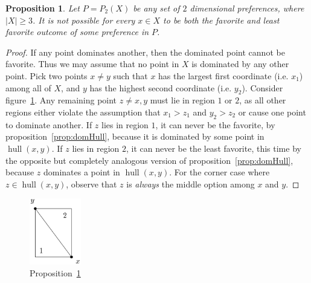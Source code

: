 \documentclass[12pt]{article}
\newtheorem{proposition}[theorem]{Proposition}
\DeclareMathOperator*{\hull}{hull}
\newcommand{\1}[1]{\mathds{1}[{#1}]}
\begin{document}
    \begin{proposition}\label{prop:noAllBestWorst}
      Let $P = P_2(X)$ be any set of $2$ dimensional preferences,
      where $|X| \ge 3$.
      It is not possible for every $x\in X$ to be both the
      favorite and least favorite outcome of some preference in $P$.
    \end{proposition}
    \begin{proof}
      If any point dominates another, then the dominated point cannot be favorite.
      Thus we may assume that no point in $X$ is dominated
      by any other point. Pick two points $x \ne y$ such that $x$ has the largest
      first coordinate (i.e. $x_1$) among all of $X$, and $y$ has the highest second
      coordinate (i.e. $y_2$).
      Consider figure~\ref{fig:noAllBestWorst}.
      Any remaining point $z\ne x,y$ must lie in region $1$ or $2$, as all other
      regions either violate the assumption that $x_1 > z_1$ and $y_2 > z_2$
      or cause one point to dominate another.
      If $z$ lies in region $1$, it can never be the favorite, by
      proposition~\ref{prop:domHull}, because it is dominated by some point in
      $\hull(x,y)$.
      If $z$ lies in region $2$, it can never be the least favorite, this time
      by the opposite but completely analogous version of 
      proposition~\ref{prop:domHull}, because $z$ dominates a point in $\hull(x,y)$.
      For the corner case where $z\in\hull(x,y)$, observe that $z$ is
      \emph{always} the middle option among $x$ and $y$.
    \end{proof}

    \begin{figure}
      \begin{center}
        \includegraphics[width=0.2\textwidth]{figures/noBestWorst}
      \end{center}
      \caption{Proposition~\ref{prop:noAllBestWorst}}
      \label{fig:noAllBestWorst}
    \end{figure}
\end{document}
